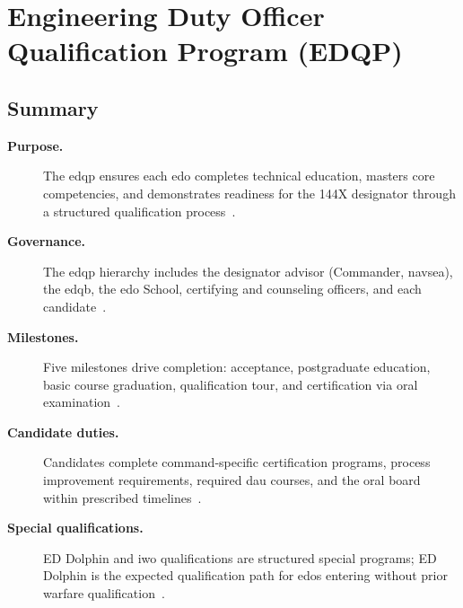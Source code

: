 \documentclass[../main.tex]{subfiles}
\begin{document}
\section{Engineering Duty Officer Qualification Program (EDQP)}

\subsection{Summary}
\begin{description}
  \item[\textbf{Purpose.}] The \ac{edqp} ensures each \ac{edo} completes technical education, masters core
  competencies, and demonstrates readiness for the 144X designator through a structured qualification
  process~\autocite{edo-5-2-2-edqp-2025,MyNavyHR-EDQP-2026}.
  \item[\textbf{Governance.}] The \ac{edqp} hierarchy includes the designator advisor (Commander,
  \ac{navsea}), the \ac{edqb}, the \ac{edo} School, certifying and counseling officers, and each
  candidate~\autocite{edo-5-2-2-edqp-2025}.
  \item[\textbf{Milestones.}] Five milestones drive completion: acceptance, postgraduate education, basic
  course graduation, qualification tour, and certification via oral examination~\autocite{edo-5-2-2-edqp-2025,MyNavyHR-EDQP-2026}.
  \item[\textbf{Candidate duties.}] Candidates complete command-specific certification programs, process
  improvement requirements, required \ac{dau} courses, and the oral board within prescribed timelines~\autocite{edo-5-2-2-edqp-2025}.
  \item[\textbf{Special qualifications.}] ED Dolphin and \ac{iwo} qualifications are structured special
  programs; ED Dolphin is the expected qualification path for \acp{edo} entering without prior warfare
  qualification~\autocite{edo-5-2-2-edqp-2025,MILPERSMAN-1301-220-EDO-Assignment}.
\end{description}
\end{document}
